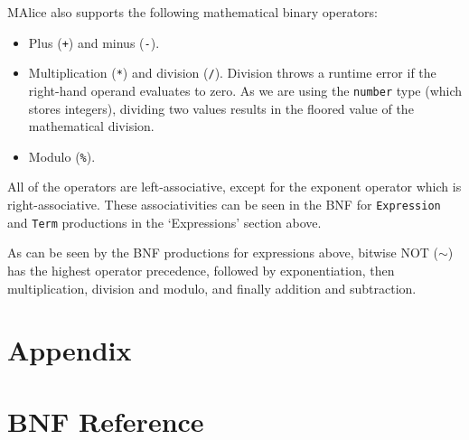 \documentclass[a4wide, 11pt]{article}
\begin{document}
MAlice also supports the following mathematical binary operators:

\begin{itemize}

\item Plus (\texttt{+}) and minus (\texttt{-}).
\item Multiplication (\texttt{*}) and division (\texttt{/}). Division throws a runtime error if the right-hand operand evaluates to zero. As we are using the \texttt{number} type (which stores integers), dividing two values results in the floored value of the mathematical division.
\item Modulo (\texttt{\%}).

\end{itemize}

All of the operators are left-associative, except for the exponent operator which is right-associative. These associativities can be seen in the BNF for \texttt{Expression} and \texttt{Term} productions in the `Expressions' section above.

As can be seen by the BNF productions for expressions above, bitwise NOT ($\sim$) has the highest operator precedence, followed by exponentiation, then multiplication, division and modulo, and finally addition and subtraction.

\section{Appendix}
\appendix

\section{BNF Reference}
\end{document}
